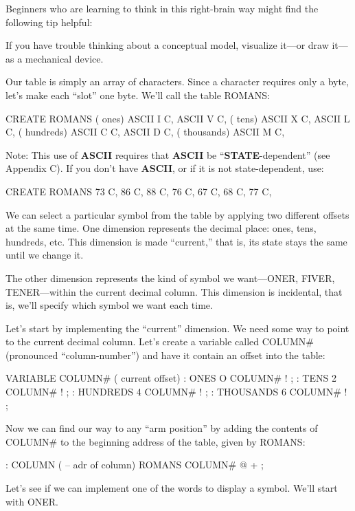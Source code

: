 Beginners who are learning to think in this right-brain way might
find the following tip helpful:

\begin{tip}
If you have trouble thinking about a conceptual model, visualize it---or
draw it---as a mechanical device.
\end{tip}
Our table is simply an array of characters. Since a character requires only
a byte, let's make each ``slot'' one byte. We'll call the table ROMANS:

\begin{Code}
CREATE ROMANS    ( ones)  ASCII I  C,   ASCII V  C,
                 ( tens)  ASCII X  C,   ASCII L  C,
             ( hundreds)  ASCII C  C,   ASCII D  C,
            ( thousands)  ASCII M  C,
\end{Code}
Note: This use of \textbf{ASCII} requires that \textbf{ASCII} be
``\textbf{STATE}-dependent'' (see Appendix C). If you don't have \textbf{ASCII},
or if it is not state-dependent, use:

\begin{Code}
CREATE ROMANS  73 C,  86 C,  88 C,  76 C,
   67 C,  68 C,  77 C,
\end{Code}

We can select a particular symbol from the table by applying two
different offsets at the same time. One dimension represents the decimal
place: ones, tens, hundreds, etc. This dimension is made ``current,'' that
is, its state stays the same until we change it.

The other dimension represents the kind of symbol we want---ONER,
FIVER, TENER---within the current decimal column. This
dimension is incidental, that is, we'll specify which symbol we want each
time.

Let's start by implementing the ``current'' dimension. We need
some way to point to the current decimal column. Let's create a variable
called COLUMN\# (pronounced ``column-number'') and have it contain an
offset into the table:

\begin{Code}
VARIABLE COLUMN#  ( current offset)
: ONES        O COLUMN# ! ;
: TENS        2 COLUMN# ! ;
: HUNDREDS    4 COLUMN# ! ;
: THOUSANDS   6 COLUMN# ! ;
\end{Code}
Now we can find our way to any ``arm position'' by adding the contents of
COLUMN\# to the beginning address of the table, given by ROMANS:

\begin{Code}
: COLUMN  ( -- adr of column)  ROMANS  COLUMN# @  + ;
\end{Code}
Let's see if we can implement one of the words to display a symbol. We'll
start with ONER.

